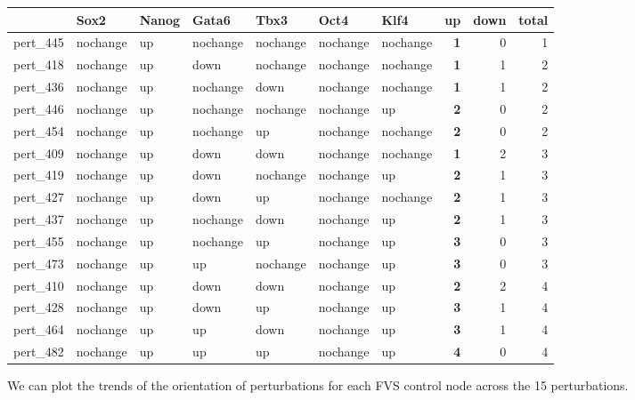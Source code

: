 \documentclass[
]{book}
\begin{document}
\begin{tabular}{l|l|l|l|l|l|l||>{}r|r|r}
\hline
  & Sox2 & Nanog & Gata6 & Tbx3 & Oct4 & Klf4 & up & down & total\\
\hline
pert\_445 & nochange & up & nochange & nochange & nochange & nochange & \textbf{1} & 0 & 1\\
\hline
pert\_418 & nochange & up & down & nochange & nochange & nochange & \textbf{1} & 1 & 2\\
\hline
pert\_436 & nochange & up & nochange & down & nochange & nochange & \textbf{1} & 1 & 2\\
\hline
pert\_446 & nochange & up & nochange & nochange & nochange & up & \textbf{2} & 0 & 2\\
\hline
pert\_454 & nochange & up & nochange & up & nochange & nochange & \textbf{2} & 0 & 2\\
\hline
pert\_409 & nochange & up & down & down & nochange & nochange & \textbf{1} & 2 & 3\\
\hline
pert\_419 & nochange & up & down & nochange & nochange & up & \textbf{2} & 1 & 3\\
\hline
pert\_427 & nochange & up & down & up & nochange & nochange & \textbf{2} & 1 & 3\\
\hline
pert\_437 & nochange & up & nochange & down & nochange & up & \textbf{2} & 1 & 3\\
\hline
pert\_455 & nochange & up & nochange & up & nochange & up & \textbf{3} & 0 & 3\\
\hline
pert\_473 & nochange & up & up & nochange & nochange & up & \textbf{3} & 0 & 3\\
\hline
pert\_410 & nochange & up & down & down & nochange & up & \textbf{2} & 2 & 4\\
\hline
pert\_428 & nochange & up & down & up & nochange & up & \textbf{3} & 1 & 4\\
\hline
pert\_464 & nochange & up & up & down & nochange & up & \textbf{3} & 1 & 4\\
\hline
pert\_482 & nochange & up & up & up & nochange & up & \textbf{4} & 0 & 4\\
\hline
\end{tabular}

We can plot the trends of the orientation of perturbations for each FVS control node across the 15 perturbations.
\end{document}

